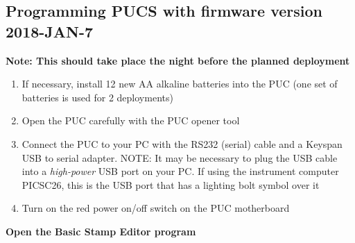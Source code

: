 \documentclass[
]{book}
\begin{document}
\hypertarget{programming-pucs-with-firmware-version-2018-jan-7}{%
\subsection{Programming PUCS with firmware version 2018-JAN-7}\label{programming-pucs-with-firmware-version-2018-jan-7}}

\textbf{Note: This should take place the night before the planned deployment}

\begin{enumerate}
\def\labelenumi{\arabic{enumi}.}
\item
  If necessary, install 12 new AA alkaline batteries into the PUC (one set of batteries is used for 2 deployments)
\item
  Open the PUC carefully with the PUC opener tool
\item
  Connect the PUC to your PC with the RS232 (serial) cable and a Keyspan USB to serial adapter. NOTE: It may be necessary to plug the USB cable into a \emph{high-power} USB port on your PC. If using the instrument computer PICSC26, this is the USB port that has a lighting bolt symbol over it
\item
  Turn on the red power on/off switch on the PUC motherboard
\end{enumerate}

\textbf{Open the Basic Stamp Editor program}
\end{document}
